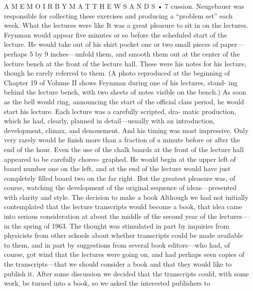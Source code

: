 \documentclass[10pt,oneside]{article}
\begin{document}
A  M E M O I R  B Y  M A T T H E W  S A N D S • 7 cussion. Neugebauer was responsible for collecting these exercises and producing a “problem set” each week. What the lectures were like It was a great pleasure to sit in on the lectures. Feynman would appear five minutes or so before the scheduled start of the lecture. He would take out of his shirt pocket one or two small pieces of paper---perhaps 5 by 9 inches---unfold them, and smooth them out at the center of the lecture bench at the front of the lecture hall. These were his notes for his lecture, though he rarely referred to them. (A photo reproduced at the beginning of Chapter 19 of Volume II shows Feynman during one of his lectures, stand- ing behind the lecture bench, with two sheets of notes visible on the bench.) As soon as the bell would ring, announcing the start of the official class period, he would start his lecture. Each lecture was a carefully scripted, dra- matic production, which he had, clearly, planned in detail---usually with an introduction, development, climax, and denouement. And his timing was most impressive. Only very rarely would he finish more than a fraction of a minute before or after the end of the hour. Even the use of the chalk boards at the front of the lecture hall appeared to be carefully choreo- graphed. He would begin at the upper left of board number one on the left, and at the end of the lecture would have just completely filled board two on the far right. But the greatest pleasure was, of course, watching the development of the original sequence of ideas---presented with clarity and style. The decision to make a book Although we had not initially contemplated that the lecture transcripts would become a book, that idea came into serious consideration at about the middle of the second year of the lectures---in the spring of 1963. The thought was stimulated in part by inquiries from physicists from other schools about whether transcripts could be made available to them, and in part by suggestions from several book editors---who had, of course, got wind that the lectures were going on, and had perhaps seen copies of the transcripts---that we should consider a book and that they would like to publish it. After some discussion we decided that the transcripts could, with some work, be turned into a book, so we asked the interested publishers to\par
\end{document}
